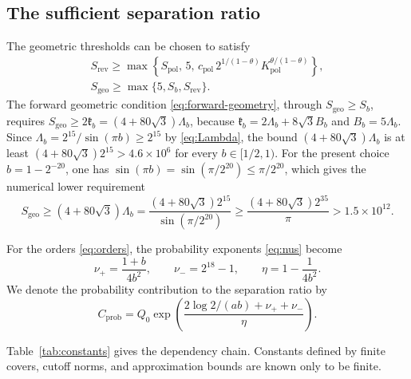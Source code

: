 \documentclass[11pt]{amsart}
\numberwithin{equation}{section}
\theoremstyle{definition}
\begin{document}
\subsection{The sufficient separation ratio}

The geometric thresholds can be chosen to satisfy
\begin{equation}
 \begin{gathered}
 S_{\mathrm{rev}}\ge
 \max\left\{
 S_{\mathrm{pol}},\,5,\,
 c_{\mathrm{pol}}\,2^{1/(1-\theta)}
 K_{\mathrm{pol}}^{\theta/(1-\theta)}
 \right\},\\
 S_{\mathrm{geo}}\ge\max\{5,S_b,S_{\mathrm{rev}}\}.
 \end{gathered}
 \label{eq:geometric-thresholds}
\end{equation}
The forward geometric condition \eqref{eq:forward-geometry}, through
\(S_{\mathrm{geo}}\ge S_b\), requires
\(S_{\mathrm{geo}}\ge2\mathfrak k_b=(4+80\sqrt3)\Lambda_b\), because
\(\mathfrak k_b=2\Lambda_b+8\sqrt3B_b\) and \(B_b=5\Lambda_b\). Since
\(\Lambda_b=2^{15}/{\sin(\pi b)}\ge2^{15}\) by \eqref{eq:Lambda}, the
bound \((4+80\sqrt3)\Lambda_b\) is at least
\((4+80\sqrt3)2^{15}>4.6\times10^6\) for every \(b\in[1/2,1)\). For the
present choice \(b=1-2^{-20}\), one has
\(\sin(\pi b)=\sin(\pi/2^{20})\le\pi/2^{20}\), which gives the numerical
lower requirement
\[
 S_{\mathrm{geo}}
 \ge(4+80\sqrt3)\Lambda_b
 =\frac{(4+80\sqrt3)2^{15}}{\sin(\pi/2^{20})}
 \ge\frac{(4+80\sqrt3)2^{35}}{\pi}
 >1.5\times10^{12}.
\]

For the orders \eqref{eq:orders}, the probability exponents
\eqref{eq:nus} become
\begin{equation}
 \nu_+=\frac{1+b}{4b^2},\qquad
 \nu_-=2^{18}-1,\qquad
 \eta=1-\frac1{4b^2}.
 \label{eq:completion-exponents}
\end{equation}
We denote the probability contribution to the separation ratio by
\begin{equation}
 C_{\mathrm{prob}}
 =Q_0\exp\!\left(
 \frac{2\log2/(ab)+\nu_++\nu_-}{\eta}\right).
 \label{eq:Cprob}
\end{equation}

Table~\ref{tab:constants} gives the dependency chain. Constants defined
by finite covers, cutoff norms, and approximation bounds are known
only to be finite.
\end{document}

